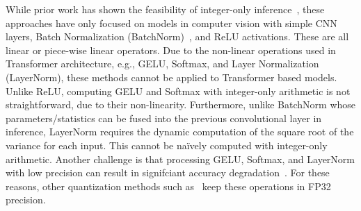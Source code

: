 While prior work has shown the feasibility of integer-only inference~\cite{jacob2018quantization,yao2020hawqv3}, these approaches have only
focused on models in computer vision with simple CNN layers, Batch Normalization (BatchNorm)~\cite{ioffe2015batch}, and ReLU activations.
These are all linear or piece-wise linear operators.
Due to the non-linear operations used in Transformer architecture, e.g., GELU, Softmax, and Layer Normalization (LayerNorm), these methods cannot be applied to Transformer based models.
Unlike ReLU, computing GELU and Softmax with integer-only arithmetic is not straightforward, due to their non-linearity.
Furthermore, unlike BatchNorm whose parameters/statistics can be fused into the previous convolutional layer in inference,
LayerNorm requires the dynamic computation of the square root of the variance for each  input.
This cannot be na\"ively  computed with integer-only arithmetic.
Another challenge is that processing
GELU, Softmax, and LayerNorm with low precision can result in signifciant accuracy degradation~\cite{zafrir2019q8bert, bhandare2019efficient}.
For these reasons, other quantization methods such as~\cite{zafrir2019q8bert,shen2020q,bhandare2019efficient} keep these operations in FP32 precision.

